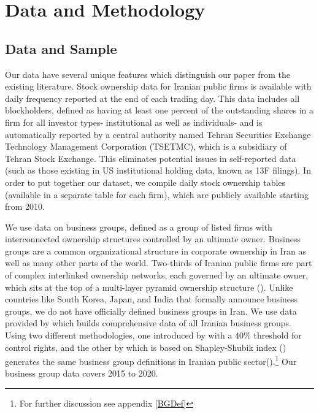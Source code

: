 
\section{{Data and Methodology}}



\subsection{{Data and Sample}}



Our data have several unique features which distinguish our paper from the existing literature. Stock ownership data for Iranian public firms is available with daily frequency reported at the end of each trading day. This data includes all blockholders, defined as having at least one percent of the outstanding shares in a firm for all investor types- institutional as well as individuals- and is automatically reported by a central authority named Tehran Securities Exchange Technology Management Corporation (TSETMC), which is a subsidiary of Tehran Stock Exchange. This eliminates potential issues in self-reported data (such as those existing in US institutional holding data, known as 13F filings). In order to put together our dataset, we compile daily stock ownership tables (available in a separate table for each firm), which are publicly available starting from 2010.

We use data on business groups, defined as a group of listed firms with interconnected ownership structures controlled by an ultimate owner. Business groups are a common organizational structure in corporate ownership in Iran as well as many other parts of the world. Two-thirds of Iranian public firms are part of complex interlinked ownership networks, each governed by an ultimate owner, which sits at the top of a multi-layer pyramid ownership structure ({\cite{Aliabadi2022}}). Unlike countries like South Korea, Japan, and India that formally announce business groups, we do not have officially defined business groups in Iran. We use data provided by {\cite{Aliabadi2022}} which builds comprehensive data of all Iranian business groups. Using two different methodologies, one introduced by \cite{almeida2011structure} with a 40\% threshold for control rights, and the other by \cite{aminadav2011rebuilding} which is based on Shapley-Shubik index (\cite{shapley1954method}) generates the same business group definitions in Iranian public sector({\cite{Aliabadi2022}}).\footnote{For further discussion see appendix \ref{BGDef}} Our business group data covers 2015 to 2020.  



